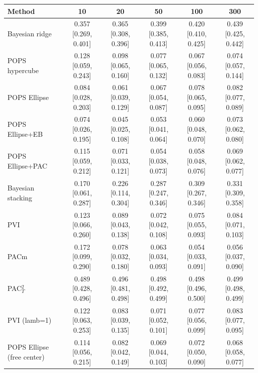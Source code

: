 \begin{tabular}{lccccc}
\toprule
Method & 10 & 20 & 50 & 100 & 300 \\
\midrule
Bayesian ridge & 0.357 {\scriptsize[0.269, 0.401]} & 0.365 {\scriptsize[0.308, 0.396]} & 0.399 {\scriptsize[0.385, 0.413]} & 0.420 {\scriptsize[0.410, 0.425]} & 0.439 {\scriptsize[0.425, 0.442]} \\
POPS hypercube & 0.128 {\scriptsize[0.059, 0.243]} & 0.098 {\scriptsize[0.065, 0.160]} & 0.077 {\scriptsize[0.065, 0.132]} & 0.067 {\scriptsize[0.056, 0.083]} & 0.074 {\scriptsize[0.057, 0.144]} \\
POPS Ellipse & 0.084 {\scriptsize[0.028, 0.203]} & 0.061 {\scriptsize[0.039, 0.129]} & 0.067 {\scriptsize[0.054, 0.087]} & 0.078 {\scriptsize[0.065, 0.095]} & 0.082 {\scriptsize[0.077, 0.089]} \\
POPS Ellipse+EB & 0.074 {\scriptsize[0.026, 0.195]} & 0.045 {\scriptsize[0.025, 0.108]} & 0.053 {\scriptsize[0.041, 0.064]} & 0.060 {\scriptsize[0.048, 0.070]} & 0.073 {\scriptsize[0.062, 0.080]} \\
POPS Ellipse+PAC & 0.115 {\scriptsize[0.059, 0.212]} & 0.071 {\scriptsize[0.033, 0.121]} & 0.054 {\scriptsize[0.038, 0.073]} & 0.058 {\scriptsize[0.048, 0.076]} & 0.069 {\scriptsize[0.062, 0.077]} \\
Bayesian stacking & 0.170 {\scriptsize[0.061, 0.287]} & 0.226 {\scriptsize[0.114, 0.304]} & 0.287 {\scriptsize[0.247, 0.346]} & 0.309 {\scriptsize[0.267, 0.346]} & 0.331 {\scriptsize[0.309, 0.358]} \\
PVI & 0.123 {\scriptsize[0.066, 0.260]} & 0.089 {\scriptsize[0.043, 0.138]} & 0.072 {\scriptsize[0.042, 0.108]} & 0.075 {\scriptsize[0.055, 0.093]} & 0.084 {\scriptsize[0.071, 0.103]} \\
PACm & 0.172 {\scriptsize[0.099, 0.290]} & 0.078 {\scriptsize[0.032, 0.180]} & 0.063 {\scriptsize[0.034, 0.093]} & 0.054 {\scriptsize[0.033, 0.091]} & 0.056 {\scriptsize[0.037, 0.090]} \\
PAC$^2_T$ & 0.489 {\scriptsize[0.428, 0.496]} & 0.496 {\scriptsize[0.481, 0.498]} & 0.498 {\scriptsize[0.492, 0.499]} & 0.498 {\scriptsize[0.496, 0.500]} & 0.499 {\scriptsize[0.498, 0.499]} \\
PVI (lamb=1) & 0.122 {\scriptsize[0.063, 0.253]} & 0.083 {\scriptsize[0.039, 0.135]} & 0.071 {\scriptsize[0.052, 0.101]} & 0.077 {\scriptsize[0.056, 0.099]} & 0.083 {\scriptsize[0.077, 0.095]} \\
POPS Ellipse (free center) & 0.114 {\scriptsize[0.056, 0.215]} & 0.082 {\scriptsize[0.042, 0.149]} & 0.069 {\scriptsize[0.044, 0.103]} & 0.072 {\scriptsize[0.050, 0.090]} & 0.068 {\scriptsize[0.058, 0.077]} \\

\end{tabular}
